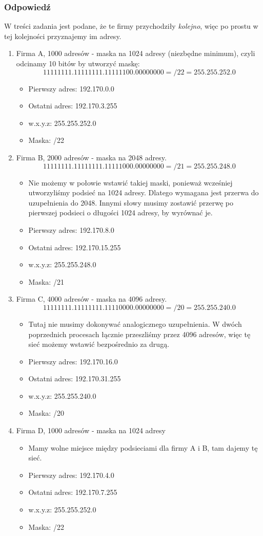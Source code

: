 \documentclass[a4paper,twoside]{article}
\begin{document}
\subsubsection{Odpowiedź}
W treści zadania jest podane, że te firmy przychodziły \textit{kolejno}, więc po prostu w tej kolejności przyznajemy im adresy.
\begin{enumerate}
	\item Firma A, 1000 adresów - maska na 1024 adresy (niezbędne minimum), czyli odcinamy 10 bitów by utworzyć maskę:
	$$ 11111111.11111111.11111100.00000000=/22=255.255.252.0$$
	\begin{itemize}
		\item Pierwszy adres: 192.170.0.0
		\item Ostatni adres: 192.170.3.255
		\item w.x.y.z: 255.255.252.0
		\item Maska: /22
	\end{itemize}
	\item Firma B, 2000 adresów - maska na 2048 adresy.
	$$ 11111111.11111111.11111000.00000000=/21=255.255.248.0$$
	\begin{itemize}
		\item Nie możemy w połowie wstawić takiej maski, ponieważ wcześniej utworzyliśmy podsieć na 1024 adresy. Dlatego wymagana jest przerwa do uzupełnienia do 2048. Innymi słowy musimy zostawić przerwę po pierwszej podsieci o długości 1024 adresy, by wyrównać je.
		\item Pierwszy adres: 192.170.8.0
		\item Ostatni adres: 192.170.15.255
		\item w.x.y.z: 255.255.248.0
		\item Maska: /21
	\end{itemize}
	\item Firma C, 4000 adresów - maska na 4096 adresy.
	$$ 11111111.11111111.11110000.00000000=/20=255.255.240.0$$
	\begin{itemize}
		\item Tutaj nie musimy dokonywać analogicznego uzupełnienia. W dwóch poprzednich procesach łącznie przeszliśmy przez 4096 adresów, więc tę sieć możemy wstawić bezpośrednio za drugą.
		\item Pierwszy adres: 192.170.16.0
		\item Ostatni adres: 192.170.31.255
		\item w.x.y.z: 255.255.240.0
		\item Maska: /20
	\end{itemize}
	\item Firma D, 1000 adresów - maska na 1024 adresy
	\begin{itemize}
		\item Mamy wolne miejsce między podsieciami dla firmy A i B, tam dajemy tę sieć.
		\item Pierwszy adres: 192.170.4.0
		\item Ostatni adres: 192.170.7.255
		\item w.x.y.z: 255.255.252.0
		\item Maska: /22
	\end{itemize}
\end{enumerate}
\newpage
\end{document}
